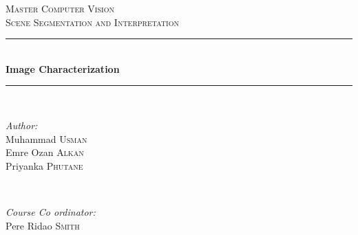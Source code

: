 \documentclass{article}
\begin{document}
\begin{titlepage}

\newcommand{\HRule}{\rule{\linewidth}{0.5mm}} %

\center %
 

\textsc{\LARGE Master Computer Vision}\\[1.5cm] %
\textsc{\Large Scene Segmentation and Interpretation}\\[0.5cm] %



\HRule \\[0.4cm]
{ \huge \bfseries Image Characterization}\\[0.4cm] %
\HRule \\[1.5cm]
 

\begin{minipage}{0.4\textwidth}
\begin{flushleft} \large
\emph{Author:}\\
Muhammad \textsc{Usman} %
\\
Emre Ozan \textsc{Alkan}\\
Priyanka \textsc{Phutane}

\end{flushleft}
\end{minipage}
~
\begin{minipage}{0.4\textwidth}
\begin{flushright} \large
\emph{Course Co ordinator:} \\
Pere Ridao \textsc{Smith} %
\end{flushright}
\end{minipage}\\[4cm]


\end{titlepage}
\end{document}
